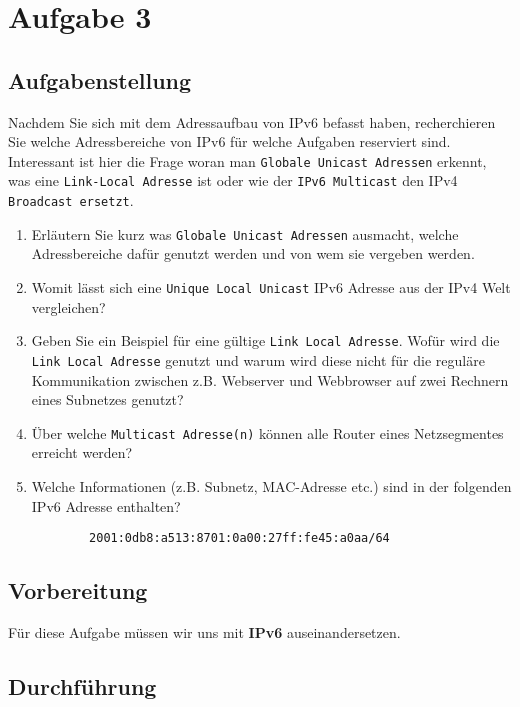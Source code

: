 \newpage

\section{Aufgabe 3}

\subsection{Aufgabenstellung}
Nachdem Sie sich mit dem Adressaufbau von IPv6 befasst haben, recherchieren Sie welche Adressbereiche von IPv6 für welche Aufgaben reserviert sind. Interessant ist hier die Frage woran man \texttt{Globale Unicast Adressen} erkennt, was eine \texttt{Link-Local Adresse} ist oder wie der \texttt{IPv6 Multicast} den IPv4 \texttt{Broadcast ersetzt}.

\begin{enumerate}[label=(\alph*)]
	\item Erläutern Sie kurz was \texttt{Globale Unicast Adressen} ausmacht, welche Adressbereiche dafür genutzt werden und von wem sie vergeben werden.
	\item Womit lässt sich eine \texttt{Unique Local Unicast} IPv6 Adresse aus der IPv4 Welt vergleichen?
	\item Geben Sie ein Beispiel für eine gültige  \texttt{Link Local Adresse}. Wofür wird die  \texttt{Link Local Adresse} genutzt und warum wird diese nicht für die reguläre Kommunikation zwischen z.B. Webserver und Webbrowser auf zwei Rechnern eines Subnetzes genutzt?
	\item Über welche \texttt{Multicast Adresse(n)} können alle Router eines Netzsegmentes erreicht werden?
	\item Welche Informationen (z.B. Subnetz, MAC-Adresse etc.) sind in der folgenden IPv6 Adresse enthalten?
\begin{lstlisting}
		2001:0db8:a513:8701:0a00:27ff:fe45:a0aa/64
\end{lstlisting}
\end{enumerate}

\subsection{Vorbereitung}
Für diese Aufgabe müssen wir uns mit \textbf{IPv6} auseinandersetzen.

\subsection{Durchführung}
